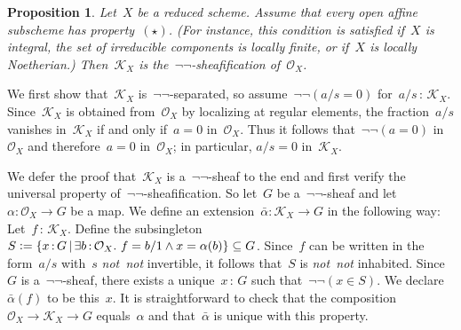 \documentclass[10pt,reqno,a4paper]{amsbook}
\makeatletter
\theoremstyle{definition}
\theoremstyle{plain}
\newtheorem{prop}[defn]{Proposition}
\theoremstyle{remark}
\renewcommand{\O}{\mathcal{O}}
\newcommand{\K}{\mathcal{K}}
\newcommand{\?}{\,{:}\,}
\renewcommand{\_}{\mathpunct{.}\,}
\newcommand{\notnot}{\emph{not~not}\xspace}
\newcommand{\defeq}{\vcentcolon=}
\renewenvironment{proof}[1][\proofname]{\par
  \pushQED{\qed}%
  \normalfont \topsep6\p@\@plus6\p@\relax
  \trivlist
  \item[\hskip\labelsep
        \itshape
    #1\@addpunct{.}]\ignorespaces
}{%
  \popQED\endtrivlist\@endpefalse
}
\makeatother
\begin{document}
\begin{prop}
\label{prop:kx-is-negneg-sheafification}
Let~$X$ be a reduced scheme. Assume that every open affine subscheme has
property~$(\star)$. (For instance, this condition is satisfied if~$X$ is
integral, the set of irreducible components is locally finite, or if~$X$ is
locally Noetherian.) Then~$\K_X$ is the~$\neg\neg$-sheafification
of~$\O_X$.\end{prop}
\begin{proof}
We first show that~$\K_X$ is~$\neg\neg$-separated,
so assume~$\neg\neg(a/s = 0)$ for~$a/s \? \K_X$. Since~$\K_X$ is obtained
from~$\O_X$ by localizing at regular elements, the fraction~$a/s$ vanishes
in~$\K_X$ if and only if~$a = 0$ in~$\O_X$. Thus it follows that~$\neg\neg(a =
0)$ in~$\O_X$ and therefore~$a = 0$ in~$\O_X$; in particular, $a/s = 0$ in~$\K_X$.

We defer the proof that~$\K_X$ is a~$\neg\neg$-sheaf to the end and first
verify the universal property of~$\neg\neg$-sheafification.
So let~$G$ be a~$\neg\neg$-sheaf and let~$\alpha : \O_X \to G$ be a map. We
define an extension~$\bar\alpha : \K_X \to G$ in the following way:
Let~$f \? \K_X$. Define the subsingleton~$S \defeq \{ x \? G \,|\, \exists
b\?\O_X\_ f = b/1 \wedge x = \alpha(b) \} \subseteq G$. Since~$f$ can be
written in the form~$a/s$ with~$s$ \notnot invertible, it follows that~$S$
is \notnot inhabited. Since~$G$ is a~$\neg\neg$-sheaf, there exists a
unique~$x\?G$ such that~$\neg\neg(x \in S)$. We declare~$\bar\alpha(f)$ to be
this~$x$. It is straightforward to check that the composition~$\O_X \to \K_X
\to G$ equals~$\alpha$ and that~$\bar\alpha$ is unique with this property.


\end{proof}
\end{document}
